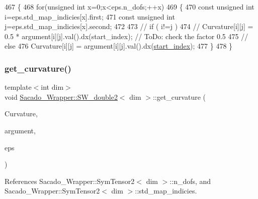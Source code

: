 \begin{DoxyCode}
467     \{
468         \textcolor{keywordflow}{for}(\textcolor{keywordtype}{unsigned} \textcolor{keywordtype}{int} x=0;x<eps.n\_dofs;++x)
469         \{
470             \textcolor{keyword}{const} \textcolor{keywordtype}{unsigned} \textcolor{keywordtype}{int} i=eps.std\_map\_indicies[x].first;
471             \textcolor{keyword}{const} \textcolor{keywordtype}{unsigned} \textcolor{keywordtype}{int} j=eps.std\_map\_indicies[x].second;
472 
473 \textcolor{comment}{//          if ( i!=j )}
474 \textcolor{comment}{//              Curvature[i][j] = 0.5 * argument[i][j].val().dx(start\_index);   // ToDo: check the factor
       0.5}
475 \textcolor{comment}{//          else}
476                 Curvature[i][j] = argument[i][j].val().dx(\hyperlink{classSacado__Wrapper_1_1SW__double2_ae7327540ad1fd725ea78ffc2268b423a}{start\_index});
477         \}
478     \}
\end{DoxyCode}
\mbox{\label{classSacado__Wrapper_1_1SW__double2_ac99cef52c5af3c6516aecf940275c595}} 
\subsubsection{\texorpdfstring{get\+\_\+curvature()}{get\_curvature()}\hspace{0.1cm}{\footnotesize\ttfamily [3/3]}}
{\footnotesize\ttfamily template$<$int dim$>$ \\
void \hyperlink{classSacado__Wrapper_1_1SW__double2}{Sacado\+\_\+\+Wrapper\+::\+S\+W\+\_\+double2}$<$ dim $>$\+::get\+\_\+curvature (\begin{DoxyParamCaption}\item[{Symmetric\+Tensor$<$ 2, dim $>$ \&}]{Curvature,  }\item[{Sacado\+::\+Fad\+::\+D\+Fad$<$ \hyperlink{Sacado__Wrapper_8h_a7e0893207b87dad05c66a34baac8ed2e}{D\+Fad\+Type} $>$ \&}]{argument,  }\item[{\hyperlink{classSacado__Wrapper_1_1SymTensor2}{Sym\+Tensor2}$<$ dim $>$ \&}]{eps }\end{DoxyParamCaption})}



References Sacado\+\_\+\+Wrapper\+::\+Sym\+Tensor2$<$ dim $>$\+::n\+\_\+dofs, and Sacado\+\_\+\+Wrapper\+::\+Sym\+Tensor2$<$ dim $>$\+::std\+\_\+map\+\_\+indicies.


